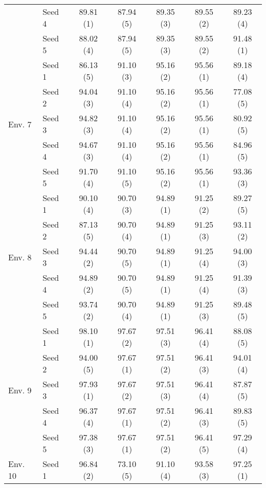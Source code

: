 \begin{table}[t]
\begin{tabular}{l l c c c c c}
         \cmidrule{2-7}
         & Seed 4 & 89.81 (1) & 87.94 (5) & 89.35 (3) & 89.55 (2) & 89.23 (4)   \\
         \cmidrule{2-7}
         & Seed 5 & 88.02 (4) & 87.94 (5) & 89.35 (3) & 89.55 (2) & 91.48 (1)  \\
         \midrule 
         \multirow{5}{*}{Env. 7} & Seed 1 & 86.13 (5) & 91.10 (3) & 95.16 (2) & 95.56 (1) & 89.18 (4)  \\
         \cmidrule{2-7}
         & Seed 2 & 94.04 (3) & 91.10 (4) & 95.16 (2) & 95.56 (1) & 77.08 (5)\\
         \cmidrule{2-7}
         & Seed 3 & 94.82 (3) & 91.10 (4) & 95.16 (2) & 95.56 (1) & 80.92 (5)   \\
         \cmidrule{2-7}
         & Seed 4 & 94.67 (3) & 91.10 (4) & 95.16 (2) & 95.56 (1) & 84.96 (5)   \\
         \cmidrule{2-7}
         & Seed 5 & 91.70 (4) & 91.10 (5) & 95.16 (2) & 95.56 (1) & 93.36 (3)  \\
         \midrule
         \multirow{5}{*}{Env. 8} & Seed 1 & 90.10 (4) & 90.70 (3) & 94.89 (1) & 91.25 (2) & 89.27 (5)  \\
         \cmidrule{2-7}
         & Seed 2 & 87.13 (5) & 90.70 (4) & 94.89 (1) & 91.25 (3) & 93.11 (2)  \\
         \cmidrule{2-7}
         & Seed 3 & 94.44 (2) & 90.70 (5) & 94.89 (1) & 91.25 (4) & 94.00 (3)    \\
         \cmidrule{2-7}
         & Seed 4 & 94.89 (2) & 90.70 (5) & 94.89 (1) & 91.25 (4) & 91.39 (3)   \\
         \cmidrule{2-7}
         & Seed 5 & 93.74 (2) & 90.70 (4) & 94.89 (1) & 91.25 (3) & 89.48 (5)  \\
         \midrule
         \multirow{5}{*}{Env. 9} & Seed 1 & 98.10 (1) & 97.67 (2) & 97.51 (3) & 96.41 (4) & 88.08 (5) \\
         \cmidrule{2-7}
         & Seed 2 & 94.00 (5) & 97.67 (1) & 97.51 (2) & 96.41 (3) & 94.01 (4)  \\
         \cmidrule{2-7}
         & Seed 3 & 97.93 (1) & 97.67 (2) & 97.51 (3) & 96.41 (4) & 87.87 (5)    \\
         \cmidrule{2-7}
         & Seed 4 & 96.37 (4) & 97.67 (1) & 97.51 (2) & 96.41 (3) & 89.83 (5)   \\
         \cmidrule{2-7}
         & Seed 5 & 97.38 (3) & 97.67 (1) & 97.51 (2) & 96.41 (5) & 97.29 (4)  \\
         \midrule
         \multirow{5}{*}{Env. 10 } & Seed 1 & 96.84 (2) & 73.10 (5) & 91.10 (4) & 93.58 (3) & 97.25 (1) \\

\end{tabular}
\end{table}
